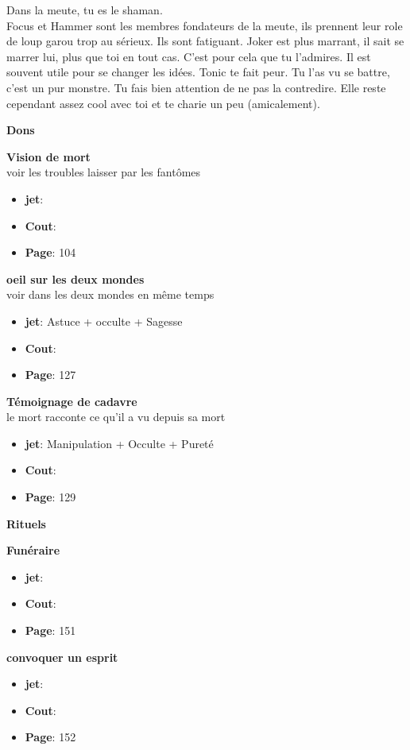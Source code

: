 \documentclass[oneside,12pt]{book}
\newcommand\don[5]{
\textbf{#1} \\
#2
\begin{itemize}
\item{ \textbf{jet}: #3}
\item{ \textbf{Cout}: #4}
\item{ \textbf{Page}: #5}
\end{itemize}
\vspace{0.5cm}
}
\begin{document}
\begin{flushleft}
\begin{description}
{Dans la meute, tu es le shaman. \\

Focus et Hammer sont les membres fondateurs de la meute, ils prennent leur role de loup garou trop au sérieux. Ils sont fatiguant.
Joker est plus marrant, il sait se marrer lui, plus que toi en tout cas. C'est pour cela que tu l'admires. Il est souvent utile pour se changer les idées.
Tonic te fait peur. Tu l'as vu se battre, c'est un pur monstre. Tu fais bien attention de ne pas la contredire. Elle reste cependant assez cool avec toi et te charie un peu (amicalement). \\

}
\end{description}
\clearpage
\textbf{\large Dons} 
\vspace{0.5cm}


\don{Vision de mort}{voir les troubles laisser par les fantômes}{}{}{104}
\don{oeil sur les deux mondes}{voir dans les deux mondes en même temps}{Astuce + occulte + Sagesse}{}{127}
\don{Témoignage de cadavre}{le mort racconte ce qu'il a vu depuis sa mort}{Manipulation + Occulte + Pureté}{}{129}

\textbf{\large Rituels} 
\vspace{0.5cm}
\don{Funéraire}{}{}{}{151}
\don{convoquer un esprit}{}{}{}{152}


\clearpage

\end{flushleft}
\end{document}

